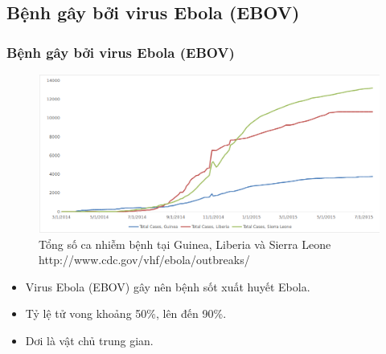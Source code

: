 \documentclass[10pt]{beamer}
\begin{document}
\subsection{Bệnh gây bởi virus Ebola (EBOV)}
	\begin{frame}
	\frametitle{Bệnh gây bởi virus Ebola (EBOV)}
	
		\begin{figure}[h]
			\vspace{-20pt}
			\centering
				\includegraphics[height=0.5\textheight,natwidth=610,natheight=642]{numberofcases}
			\caption{Tổng số ca nhiễm bệnh tại Guinea, Liberia và Sierra Leone  \mbox{http://www.cdc.gov/vhf/ebola/outbreaks/}}
		\end{figure}
		\label{numberofcases}
		\vspace{-20pt}
		\begin{itemize}
		\item Virus Ebola (EBOV) gây nên bệnh sốt xuất huyết Ebola.
		\item Tỷ lệ tử vong khoảng 50\%, lên đến 90\%.
		\item Dơi là vật chủ trung gian.
		\end{itemize}
	\end{frame}
	
\end{document}
